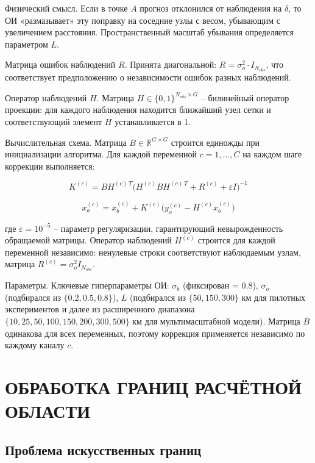 \documentclass[14pt,a4paper]{extarticle}
\numberwithin{table}{section}
\numberwithin{figure}{section}
\numberwithin{equation}{section}
\begin{document}
Физический смысл. Если в точке \(A\) прогноз отклонился от
наблюдения на \(\delta\), то ОИ «размазывает» эту поправку на соседние
узлы с весом, убывающим с увеличением расстояния. Пространственный
масштаб убывания определяется параметром \(L\).

Матрица ошибок наблюдений \(R\). Принята диагональной:
\(R = \sigma_o^2 \cdot I_{N_{obs}}\), что соответствует предположению о
независимости ошибок разных наблюдений.

Оператор наблюдений \(H\). Матрица
\(H \in \{0,1\}^{N_{obs} \times G}\) -- билинейный оператор проекции:
для каждого наблюдения находится ближайший узел сетки и соответствующий
элемент \(H\) устанавливается в 1.

Вычислительная схема. Матрица \(B \in \mathbb{R}^{G \times G}\)
строится единожды при инициализации алгоритма. Для каждой переменной
\(c = 1,\ldots,C\) на каждом шаге коррекции выполняется:

\[K^{(c)} = B H^{(c)\,T}\bigl(H^{(c)} B H^{(c)\,T} + R^{(c)} + \varepsilon I\bigr)^{-1}\]

\[x_a^{(c)} = x_b^{(c)} + K^{(c)}\bigl(y_o^{(c)} - H^{(c)} x_b^{(c)}\bigr)\]

где \(\varepsilon = 10^{-5}\) -- параметр регуляризации, гарантирующий
невырожденность обращаемой матрицы. Оператор наблюдений \(H^{(c)}\)
строится для каждой переменной независимо: ненулевые строки
соответствуют наблюдаемым узлам, матрица
\(R^{(c)} = \sigma_o^2 I_{N_{obs}}\).

Параметры. Ключевые гиперпараметры ОИ: \(\sigma_b\) (фиксирован
= 0.8), \(\sigma_o\) (подбирался из \(\{0.2, 0.5, 0.8\}\)), \(L\)
(подбирался из \(\{50, 150, 300\}\) км для пилотных экспериментов
и далее из расширенного диапазона \(\{10, 25, 50, 100, 150, 200, 300, 500\}\) км
для мультимасштабной модели). Матрица \(B\) одинакова
для всех переменных, поэтому коррекция применяется независимо по каждому
каналу \(c\).


\newpage

\section{ОБРАБОТКА ГРАНИЦ РАСЧЁТНОЙ ОБЛАСТИ}\label{ux43eux431ux440ux430ux431ux43eux442ux43aux430-ux433ux440ux430ux43dux438ux446-ux440ux430ux441ux447ux451ux442ux43dux43eux439-ux43eux431ux43bux430ux441ux442ux438}

\subsection{Проблема искусственных границ}\label{ux43fux440ux43eux431ux43bux435ux43cux430-ux438ux441ux43aux443ux441ux441ux442ux432ux435ux43dux43dux44bux445-ux433ux440ux430ux43dux438ux446}
\end{document}
